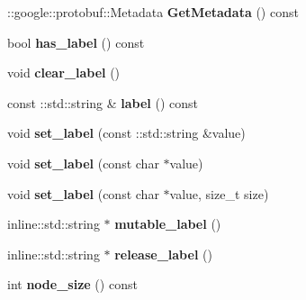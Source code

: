 \begin{DoxyCompactItemize}
\item 
\hypertarget{classgraph_1_1Graph_aeafa7e8b0429a852055f80767941cb38}{
::google::protobuf::Metadata {\bfseries GetMetadata} () const }
\label{classgraph_1_1Graph_aeafa7e8b0429a852055f80767941cb38}

\item 
\hypertarget{classgraph_1_1Graph_a8a43e784467fb4eda053810d73725508}{
bool {\bfseries has\_\-label} () const }
\label{classgraph_1_1Graph_a8a43e784467fb4eda053810d73725508}

\item 
\hypertarget{classgraph_1_1Graph_ae493d41f9b434145be083cbc2044c1d9}{
void {\bfseries clear\_\-label} ()}
\label{classgraph_1_1Graph_ae493d41f9b434145be083cbc2044c1d9}

\item 
\hypertarget{classgraph_1_1Graph_a7063c43da1905648d2948ce1c13d38ff}{
const ::std::string \& {\bfseries label} () const }
\label{classgraph_1_1Graph_a7063c43da1905648d2948ce1c13d38ff}

\item 
\hypertarget{classgraph_1_1Graph_ab04d4c18c9ab77ee27d5e66b92624bdd}{
void {\bfseries set\_\-label} (const ::std::string \&value)}
\label{classgraph_1_1Graph_ab04d4c18c9ab77ee27d5e66b92624bdd}

\item 
\hypertarget{classgraph_1_1Graph_a2e33bd3438f862850c7f2fad8bb3e544}{
void {\bfseries set\_\-label} (const char $\ast$value)}
\label{classgraph_1_1Graph_a2e33bd3438f862850c7f2fad8bb3e544}

\item 
\hypertarget{classgraph_1_1Graph_a829bbd790ed76b6b1729d4c719b413d7}{
void {\bfseries set\_\-label} (const char $\ast$value, size\_\-t size)}
\label{classgraph_1_1Graph_a829bbd790ed76b6b1729d4c719b413d7}

\item 
\hypertarget{classgraph_1_1Graph_ab3b46393b1918c6608320f57d9486f12}{
inline::std::string $\ast$ {\bfseries mutable\_\-label} ()}
\label{classgraph_1_1Graph_ab3b46393b1918c6608320f57d9486f12}

\item 
\hypertarget{classgraph_1_1Graph_a95233ad394bd217ae7b49bb4498e48f3}{
inline::std::string $\ast$ {\bfseries release\_\-label} ()}
\label{classgraph_1_1Graph_a95233ad394bd217ae7b49bb4498e48f3}

\item 
\hypertarget{classgraph_1_1Graph_a005baadb25b7b9611082a1c3f285cdfa}{
int {\bfseries node\_\-size} () const }
\label{classgraph_1_1Graph_a005baadb25b7b9611082a1c3f285cdfa}


\end{DoxyCompactItemize}

